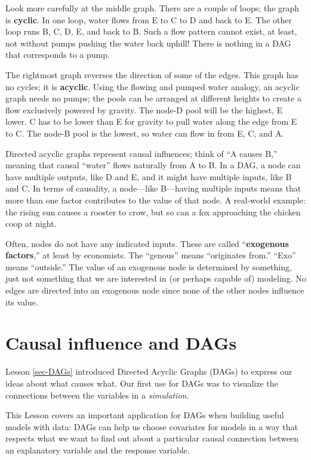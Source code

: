 \documentclass[
  letterpaper,
  DIV=11,
  numbers=noendperiod,
  oneside]{scrartcl}
\begin{document}
\begin{tcolorbox}
Look more carefully at the middle graph. There are a couple of loops;
the graph is \textbf{cyclic}. In one loop, water flows from E to C to D
and back to E. The other loop runs B, C, D, E, and back to B. Such a
flow pattern cannot exist, at least, not without pumps pushing the water
back uphill! There is nothing in a DAG that corresponds to a pump.

The rightmost graph reverses the direction of some of the edges. This
graph has no cycles; it is \textbf{acyclic}. Using the flowing and
pumped water analogy, an acyclic graph needs no pumps; the pools can be
arranged at different heights to create a flow exclusively powered by
gravity. The node-D pool will be the highest, E lower. C has to be lower
than E for gravity to pull water along the edge from E to C. The node-B
pool is the lowest, so water can flow in from E, C, and A.

Directed acyclic graphs represent causal influences; think of ``A causes
B,'' meaning that causal ``water'' flows naturally from A to B. In a
DAG, a node can have multiple outputs, like D and E, and it might have
multiple inputs, like B and C. In terms of causality, a node---like
B---having multiple inputs means that more than one factor contributes
to the value of that node. A real-world example: the rising sun causes a
rooster to crow, but so can a fox approaching the chicken coop at night.

Often, nodes do not have any indicated inputs. These are called
``\textbf{exogenous factors},'' at least by economists. The ``genous''
means ``originates from.'' ``Exo'' means ``outside.'' The value of an
exogenous node is determined by something, just not something that we
are interested in (or perhaps capable of) modeling. No edges are
directed into an exogenous node since none of the other nodes influence
its value.

\end{tcolorbox}

\newpage

\section{Causal influence and DAGs}\label{sec-dag-causality}

Lesson \ref{sec-DAGs} introduced Directed Acyclic Graphs (DAGs) to
express our ideas about what causes what. Our first use for DAGs was to
visualize the connections between the variables in a \emph{simulation}.

This Lesson covers an important application for DAGs when building
useful models with data: DAGs can help us choose covariates for models
in a way that respects what we want to find out about a particular
causal connection between an explanatory variable and the response
variable.
\end{document}
